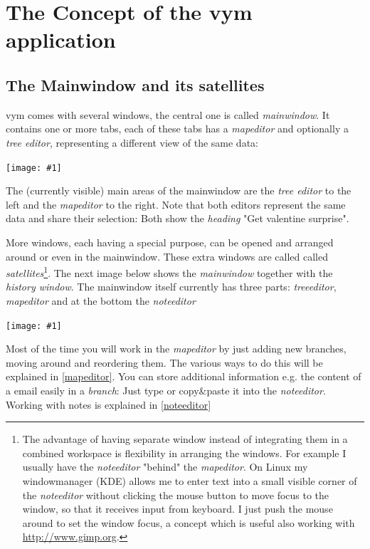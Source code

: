 \documentclass[12pt,a4paper]{article}
\newcommand{\maximage}[1]{  
    \begin{center}
        \texttt{[image: \#1]} 
    \end{center}
}
\newcommand{\vym}{{\sc vym }}
\begin{document}
\newpage
\section{The Concept of the \vym application}
\subsection{The Mainwindow and its satellites} \label{satellite}
\vym comes with several windows, the central one is called {\em
mainwindow}. It contains one or more
tabs, each of these tabs has a {\em mapeditor} and optionally a {\em
tree editor}, representing a different view of the same data:
\maximage{images/mainwindow.png}
The (currently visible) main areas of the mainwindow are the {\em tree
editor} to the left and the {\em mapeditor} to the right. Note that both
editors represent the same data and share their selection: Both show the
{\em heading} "Get valentine surprise".

More windows, each having a special purpose, can be opened and arranged
around or even in the mainwindow. These extra windows are called
called {\em satellites}\footnote{
    The advantage of having separate window instead of integrating them
    in a combined workspace is flexibility in arranging the windows. For
    example I usually have the {\em noteeditor} "behind" the {\em
    mapeditor}. On Linux my windowmanager (KDE) allows me to enter text
    into a small visible corner of the {\em noteeditor} without clicking
    the mouse button to move focus to the window, so that it receives
    input from keyboard. I just push the mouse around to set the
    window focus, a concept which is useful also working with 
    \href{http://www.gimp.org}{http://www.gimp.org}.
}. 
The next image below shows the {\em mainwindow}
together with the {\em history window}. The mainwindow itself currently
has three parts: {\em treeeditor}, {\em mapeditor} and at the bottom
the {\em noteeditor}
\maximage{images/windows.png}
Most of the time you will work in the {\em mapeditor} by just adding new
branches, moving around and reordering them. The various ways to do this
will be explained in \ref{mapeditor}. You can store additional
information e.g. the content of a email easily in a {\em branch}: Just
type or copy\&paste it into the {\em noteeditor}. Working with notes is
explained in \ref{noteeditor}
\end{document}
